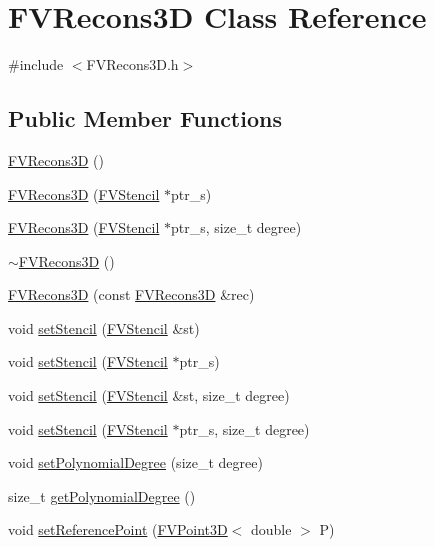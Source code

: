 \hypertarget{classFVRecons3D}{
\section{FVRecons3D Class Reference}
\label{d5/da3/classFVRecons3D}
}


{\ttfamily \#include $<$FVRecons3D.h$>$}

\subsection*{Public Member Functions}
\begin{DoxyCompactItemize}
\item 
\hyperlink{classFVRecons3D_a794fc6dfdf221283a8c473f63d8b21ac}{FVRecons3D} ()
\item 
\hyperlink{classFVRecons3D_a4f5ba7dba3beb3a7f336197075b40766}{FVRecons3D} (\hyperlink{classFVStencil}{FVStencil} $\ast$ptr\_\-s)
\item 
\hyperlink{classFVRecons3D_a7a3d51d26d45efb6c2cf5af17bba0ee7}{FVRecons3D} (\hyperlink{classFVStencil}{FVStencil} $\ast$ptr\_\-s, size\_\-t degree)
\item 
\hyperlink{classFVRecons3D_ae9d76ac0be05c86ca34a8c0a684395f8}{$\sim$FVRecons3D} ()
\item 
\hyperlink{classFVRecons3D_a346c9b481c6f746cbfda00d101e00e58}{FVRecons3D} (const \hyperlink{classFVRecons3D}{FVRecons3D} \&rec)
\item 
void \hyperlink{classFVRecons3D_a34d8474a5f5470cab6f077871c7387da}{setStencil} (\hyperlink{classFVStencil}{FVStencil} \&st)
\item 
void \hyperlink{classFVRecons3D_a9fd35e2a4d7096ce3fec84bfc30bf095}{setStencil} (\hyperlink{classFVStencil}{FVStencil} $\ast$ptr\_\-s)
\item 
void \hyperlink{classFVRecons3D_a82cbc1bab2638e760ea3ca50bd393ba6}{setStencil} (\hyperlink{classFVStencil}{FVStencil} \&st, size\_\-t degree)
\item 
void \hyperlink{classFVRecons3D_a6d820346769771af609dbdaa7b1f3021}{setStencil} (\hyperlink{classFVStencil}{FVStencil} $\ast$ptr\_\-s, size\_\-t degree)
\item 
void \hyperlink{classFVRecons3D_a277a64063b5e54974f88aa36f01dd729}{setPolynomialDegree} (size\_\-t degree)
\item 
size\_\-t \hyperlink{classFVRecons3D_a51ced9e32566282ad2c8aa54e23f3cc5}{getPolynomialDegree} ()
\item 
void \hyperlink{classFVRecons3D_afff924129a8f2ce2720e101209b0c770}{setReferencePoint} (\hyperlink{classFVPoint3D}{FVPoint3D}$<$ double $>$ P)

\end{DoxyCompactItemize}
